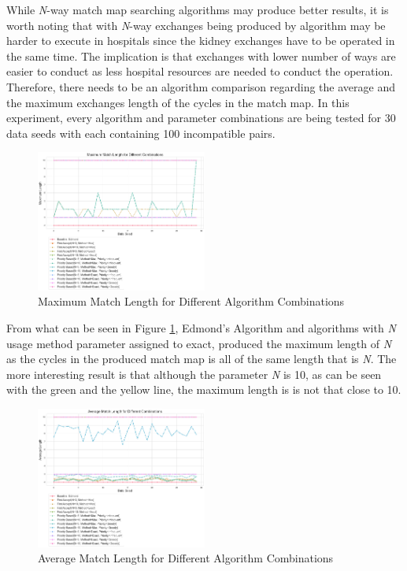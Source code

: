 \documentclass[conference]{IEEEtran}
\begin{document}
While \textit{N}-way match map searching algorithms may produce better results, it is worth noting that with \textit{N}-way exchanges
being produced by algorithm may be harder to execute in hospitals since the kidney exchanges have to be operated in the same time. The
implication is that exchanges with lower number of ways are easier to conduct as less hospital resources are needed to conduct the operation.
Therefore, there needs to be an algorithm comparison regarding the average and the maximum exchanges length of the cycles in the match map.
In this experiment, every algorithm and parameter combinations are being tested for 30 data seeds with each containing 100 incompatible pairs. 

\begin{figure}[h]
   \includegraphics[width=0.5\textwidth]{images/maximum_match_length_for_different_combinations.png}
   \caption{Maximum Match Length for Different Algorithm Combinations}
   \label{figuremaxlength}
\end{figure}

From what can be seen in Figure \ref{figuremaxlength}, Edmond's Algorithm and algorithms with \textit{N} usage method parameter assigned to exact, produced the maximum
length of \textit{N} as the cycles in the produced match map is all of the same length that is \textit{N}.
The more interesting result is that although the parameter \textit{N} is 10, as can be seen with the green and the yellow line, the maximum length is
is not that close to 10. 

\begin{figure}[h]
    \includegraphics[width=0.5\textwidth]{images/average_match_length_for_different_combinations.png}
    \caption{Average Match Length for Different Algorithm Combinations}
    \label{figureavglength}
\end{figure}
\end{document}
